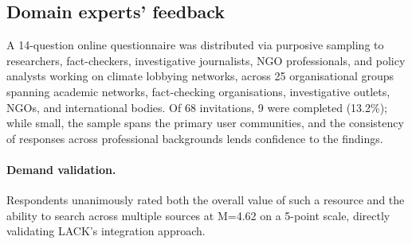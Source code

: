 \vspace{-0.2cm}\subsection{Domain experts' feedback}
A 14-question online questionnaire was distributed via purposive sampling to researchers, fact-checkers, investigative journalists, NGO professionals, and policy analysts working on climate lobbying networks, across 25 organisational groups spanning academic networks, fact-checking organisations, investigative outlets, NGOs, and international bodies.
Of 68 invitations, 9 were completed (13.2\%); while small, the sample spans the primary user communities, and the consistency of responses across professional backgrounds lends confidence to the findings.


\vspace{-0.3cm}\paragraph{Demand validation.} Respondents unanimously rated both the overall value of such a resource and the ability to search across multiple sources at M=4.62 on a 5-point scale, directly validating LACK's integration approach.


